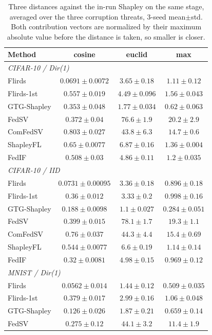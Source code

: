 \documentclass[letterpaper]{article} %
\theoremstyle{plain}
\begin{document}
\begin{table}[t]
\centering
\small
\setlength{\tabcolsep}{4pt}
\caption{Three distances against the in-run Shapley on the same stage,
averaged over the three corruption threats, 3-seed mean$\pm$std. Both
contribution vectors are normalized by their maximum absolute value before
the distance is taken, so smaller is closer.}
\label{tab:dist-main}
\begin{tabular}{lccc}
\hline
Method & cosine & euclid & max \\
\hline
\multicolumn{4}{l}{\emph{CIFAR-10 / Dir(1)}} \\
Flirds & $0.0691\pm0.0072$ & $3.65\pm0.18$ & $1.11\pm0.12$ \\
Flirds-1st & $0.557\pm0.019$ & $4.49\pm0.096$ & $1.56\pm0.043$ \\
GTG-Shapley & $0.353\pm0.048$ & $1.77\pm0.034$ & $0.62\pm0.063$ \\
FedSV & $0.372\pm0.04$ & $76.6\pm1.9$ & $20.2\pm2.9$ \\
ComFedSV & $0.803\pm0.027$ & $43.8\pm6.3$ & $14.7\pm0.6$ \\
ShapleyFL & $0.65\pm0.0077$ & $6.87\pm0.16$ & $1.36\pm0.004$ \\
FedIF & $0.508\pm0.03$ & $4.86\pm0.11$ & $1.2\pm0.035$ \\
\hline
\multicolumn{4}{l}{\emph{CIFAR-10 / IID}} \\
Flirds & $0.0731\pm0.00095$ & $3.36\pm0.18$ & $0.896\pm0.18$ \\
Flirds-1st & $0.36\pm0.012$ & $3.33\pm0.2$ & $0.998\pm0.16$ \\
GTG-Shapley & $0.188\pm0.0098$ & $1.1\pm0.027$ & $0.284\pm0.051$ \\
FedSV & $0.399\pm0.015$ & $78.1\pm1.7$ & $19.3\pm1.1$ \\
ComFedSV & $0.76\pm0.037$ & $44.3\pm4.4$ & $15.4\pm0.69$ \\
ShapleyFL & $0.544\pm0.0077$ & $6.6\pm0.19$ & $1.14\pm0.14$ \\
FedIF & $0.32\pm0.0081$ & $4.98\pm0.15$ & $0.969\pm0.12$ \\
\hline
\multicolumn{4}{l}{\emph{MNIST / Dir(1)}} \\
Flirds & $0.0562\pm0.014$ & $1.44\pm0.12$ & $0.509\pm0.035$ \\
Flirds-1st & $0.379\pm0.017$ & $2.99\pm0.16$ & $1.06\pm0.048$ \\
GTG-Shapley & $0.126\pm0.026$ & $1.87\pm0.21$ & $0.659\pm0.14$ \\
FedSV & $0.275\pm0.12$ & $44.1\pm3.2$ & $11.4\pm1.9$ \\

\end{tabular}
\end{table}
\end{document}
